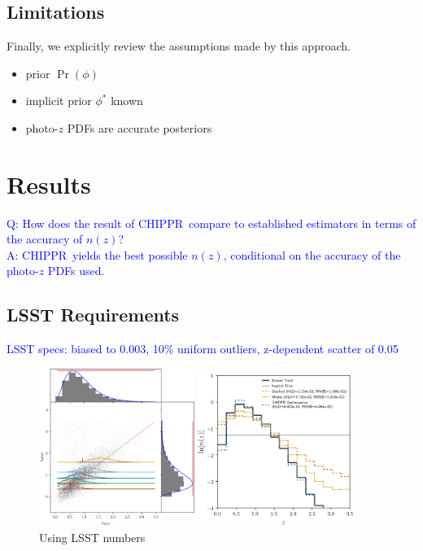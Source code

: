 \documentclass[iop]{emulateapj}
\newcommand{\chippr}{CHIPPR}
\newcommand{\pzpdf}{photo-$z$ PDF}
\begin{document}
\subsection{Limitations}
\label{sec:limitations}

Finally, we explicitly review the assumptions made by this approach.
\begin{itemize}
  \item prior $\Pr(\phi)$
  \item implicit prior $\phi^{*}$ known
	\item \pzpdf s are accurate posteriors
	\end{itemize}






\section{Results}
\label{sec:results}

\textcolor{blue}{Q: How does the result of \chippr\ compare to established 
estimators in terms of the accuracy of $n(z)$?\\
A: \chippr\ yields the best possible $n(z)$, conditional on the accuracy of the 
photo-$z$ PDFs used.}

\subsection{LSST Requirements}
\label{sec:lsstdemo}

\textcolor{blue}{LSST specs: biased to 0.003, 10\% uniform outliers, 
z-dependent scatter of 0.05}

\begin{figure}
	\begin{center}
		\includegraphics[width=0.45\textwidth]{fig/lsst_scatter.png}
		
\includegraphics[width=0.45\textwidth]{fig/lsst_log_estimators.png}
		\caption{Using LSST numbers}
		\label{fig:lsstdemo}
	\end{center}
\end{figure}
\end{document}
